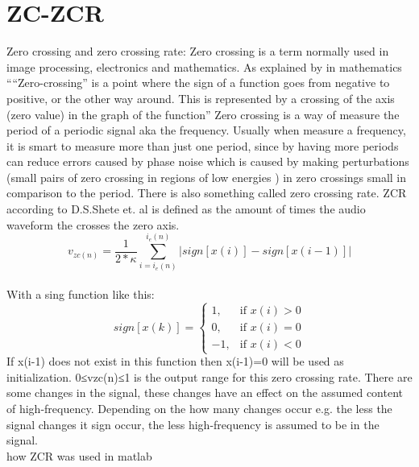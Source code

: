 \section{ZC-ZCR}

Zero crossing and zero crossing rate:
Zero crossing is a term normally used in image processing, electronics and mathematics. As explained by \cite{Al-Zhrani2010} in mathematics ““Zero-crossing” is a point where the sign of a function goes from negative to positive, or the other way around. This is represented by a crossing of the axis (zero value) in the graph of the function” \cite{Al-Zhrani2010}
Zero crossing is a way of measure the period of a periodic signal aka the frequency.\cite{RWW2012}  Usually when measure a frequency, it is smart to measure more than just one period, since by having more periods can reduce errors caused by phase noise which is caused by making perturbations (small pairs of zero crossing in regions of low energies \cite{Mallat1988} ) in zero crossings small in comparison to the period. \cite{RWW2012}
There is also something called zero crossing rate. ZCR according to D.S.Shete et. al is defined as the amount of times the audio waveform the crosses the zero axis.\\

\begin{equation}\label{eq:ZCR}
v_{zc(n)}= \frac{1}{2* \kappa}\sum_{i=i_e(n)}^{i_e (n)}|sign[x(i)]-sign[x(i-1)]|
\end{equation}
\\
With a sing function like this:
\begin{equation}
sign[x(k)]=
\begin{cases}
 1, & \text{if } x(i)>0\\ 
 0, & \text{if } x(i)=0\\
-1, & \text{if } x(i)<0
\end{cases}
\end{equation}
If x(i-1) does not exist in this function then x(i-1)=0 will be used as initialization. 
0≤vzc(n)≤1 is the output range for this zero crossing rate. There are some changes in the signal, these changes have an effect on the assumed content of high-frequency. Depending on the how many changes occur e.g. the less the signal changes it sign occur, the less high-frequency is assumed to be in the signal. \citep{AlZhrani2010} 
\\
how ZCR was used in matlab
\\
